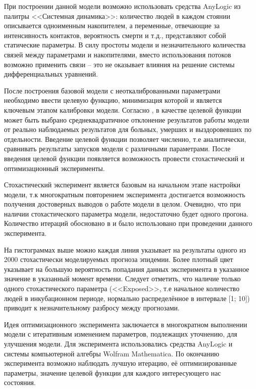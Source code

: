 При построении данной модели возможно использовать средства AnyLogic из палитры <<Системная динамика>>: количество людей в каждом стоянии описывается одноименным накопителем, а переменные, отвечающие за интенсивность контактов, вероятность смерти и т.д., представляют собой статические параметры. В силу простоты модели и незначительного количества связей между параметрами и накопителями, вместо использования потоков возможно применить связи -- это не оказывает влияния на решение системы дифференциальных уравнений. 

После построения базовой модели с неоткалиброванными параметрами необходимо ввести целевую функцию, минимизация которой и является ключевым этапом калибровки модели. Согласно  %
, в качестве  целевой функции может быть выбрано среднеквадратичное отклонение результатов работы модели от  реально наблюдаемых результатов для больных, умерших и выздоровевших по отдельности. Введение целевой функции позволяет численно, т.е аналитически, сравнивать результаты запусков модели с различными параметрами.
После введения целевой функции появляется возможность провести стохастический и оптимизационный эксперименты.

Стохастический эксперимент является базовым на начальном этапе настройки модели, т.к многократным повторением эксперимента достигается возможность получения достоверных выводов о работе модели в целом. Очевидно, что при наличии стохастического параметра модели, недостаточно будет одного прогона. Количество итераций обосновано в  %
и было использовано при проведении данного эксперимента. 


На гистограммах выше можно каждая линия указывает на результаты одного из 2000 стохастически моделируемых прогноза эпидемии.  Более плотный цвет указывает на большую вероятность попадания данных эксперимента в указанное значение в указанный момент времени. Следует отметить, что наличие только одного стохастического параметра (<<Exposed>>, т.е начальное количество людей в инкубационном периоде, нормально распределённое в интервале [1; 10]) приводит  к незначительному разбросу между прогнозами.

Идея  оптимизационного  эксперимента заключается в многократном выполнении модели с итеративным изменением параметров, подлежащих уточнению, для улучшения модели. Для эксперимента использовались средства AnyLogic  и системы компьютерной алгебры Wolfram Mathematica. По окончанию эксперимента возможно наблюдать лучшую итерацию, её оптимизированные параметры, значение целевой функции для каждого интересующего нас состояния.

